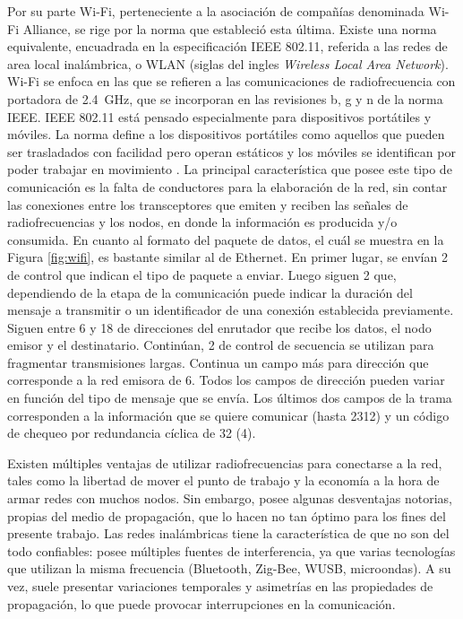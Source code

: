 Por su parte Wi-Fi, perteneciente a la asociación de compañías denominada Wi-Fi Alliance, se rige por la norma que estableció esta última. Existe una norma equivalente, encuadrada en la especificación IEEE 802.11, referida a las redes de area local inalámbrica, o WLAN (siglas del ingles {\it Wireless Local Area Network}). Wi-Fi se enfoca en las que se refieren a las comunicaciones de radiofrecuencia con portadora de \SI{2,4}{\giga\hertz}, que se incorporan en las revisiones b, g y n de la norma IEEE. IEEE 802.11 está pensado especialmente para dispositivos portátiles y móviles. La norma define a los dispositivos portátiles como aquellos que pueden ser trasladados con facilidad pero operan estáticos y los móviles se identifican por poder trabajar en movimiento \cite{wifi2016}. La principal característica que posee este tipo de comunicación es la falta de conductores para la elaboración de la red, sin contar las conexiones entre los transceptores que emiten y reciben las señales de radiofrecuencias y los nodos, en donde la información es producida y/o consumida. En cuanto al formato del paquete de datos, el cuál se muestra en la Figura \ref{fig:wifi}, es bastante similar al de Ethernet. En primer lugar, se envían \SI{2}{\byte} de control que indican el tipo de paquete a enviar. Luego siguen \SI{2}{\byte} que, dependiendo de la etapa de la comunicación puede indicar la duración del mensaje a transmitir o un identificador de una conexión establecida previamente. Siguen entre \si{6} y \SI{18}{\byte} de direcciones del enrutador que recibe los datos, el nodo emisor y el destinatario. Continúan, \SI{2}{\byte} de control de secuencia se utilizan para fragmentar transmisiones largas. Continua un campo más para dirección que corresponde a la red emisora de \SI{6}{\byte}. Todos los campos de dirección pueden variar en función del tipo de mensaje que se envía. Los últimos dos campos de la trama corresponden a la información que se quiere comunicar (hasta \SI{2312}{\byte}) y un código de chequeo por redundancia cíclica de \SI{32}{\bit} (\SI{4}{\byte}).%

Existen múltiples ventajas de utilizar radiofrecuencias para conectarse a la red, tales como la libertad de mover el punto de trabajo y la economía a la hora de armar redes con muchos nodos. Sin embargo, posee algunas desventajas notorias, propias del medio de propagación, que lo hacen no tan óptimo para los fines del presente trabajo. Las redes inalámbricas tiene la característica de que no son del todo confiables: posee múltiples fuentes de interferencia, ya que varias tecnologías que utilizan la misma frecuencia (Bluetooth, Zig-Bee, WUSB, microondas). A su vez, suele presentar variaciones temporales y asimetrías en las propiedades de propagación, lo que puede provocar interrupciones en la comunicación.%

